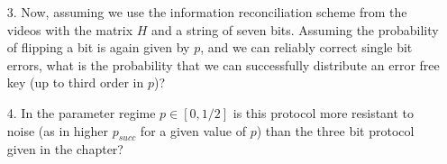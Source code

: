 \begin{exercises}
\begin{enumerate}
\item[3.] Now, assuming we use the information reconciliation scheme from the videos with the matrix \(H\) and a string of seven bits. Assuming the probability of flipping a bit is again given by \(p\), and we can reliably correct single bit errors, what is the probability that we can successfully distribute an error free key (up to third order in \(p\))?
\item[4.] In the parameter regime \(p\in [0,1/2]\) is this protocol more resistant to noise (as in higher \(p_{succ}\) for a given value of \(p\)) than the three bit protocol given in the chapter?
\end{enumerate}

\end{exercises}
